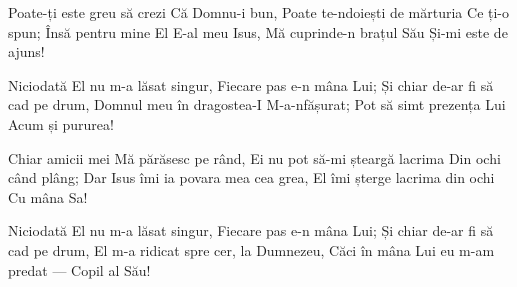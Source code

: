 \beginverse
Poate-ți este greu să crezi
Că Domnu-i bun,
Poate te-ndoiești de mărturia
Ce ți-o spun;
Însă pentru mine El
E-al meu Isus,
Mă cuprinde-n brațul Său
Și-mi este de ajuns!
\endverse

\beginchorus
Niciodată El nu m-a lăsat singur,
Fiecare pas e-n mâna Lui;
Și chiar de-ar fi să cad pe drum,
Domnul meu în dragostea-I
M-a-nfășurat;
Pot să simt prezența Lui
Acum și pururea!
\endchorus

\beginverse
Chiar amicii mei
Mă părăsesc pe rând,
Ei nu pot să-mi șteargă lacrima
Din ochi când plâng;
Dar Isus îmi ia povara mea cea grea,
El îmi șterge lacrima din ochi
Cu mâna Sa!
\endverse

\beginchorus
Niciodată El nu m-a lăsat singur,
Fiecare pas e-n mâna Lui;
Și chiar de-ar fi să cad pe drum,
El m-a ridicat spre cer, la Dumnezeu,
Căci în mâna Lui eu m-am predat —
Copil al Său!
\endchorus
\endsong